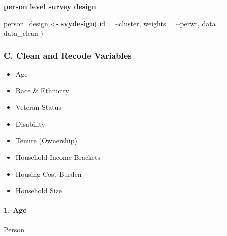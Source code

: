 \documentclass[
]{article}
\newenvironment{Shaded}{\begin{snugshade}}{\end{snugshade}}
\newcommand{\AttributeTok}[1]{\textcolor[rgb]{0.13,0.29,0.53}{#1}}
\newcommand{\CommentTok}[1]{\textcolor[rgb]{0.56,0.35,0.01}{\textit{#1}}}
\newcommand{\ConstantTok}[1]{\textcolor[rgb]{0.56,0.35,0.01}{#1}}
\newcommand{\DecValTok}[1]{\textcolor[rgb]{0.00,0.00,0.81}{#1}}
\newcommand{\FunctionTok}[1]{\textcolor[rgb]{0.13,0.29,0.53}{\textbf{#1}}}
\newcommand{\NormalTok}[1]{#1}
\newcommand{\OtherTok}[1]{\textcolor[rgb]{0.56,0.35,0.01}{#1}}
\newcommand{\SpecialCharTok}[1]{\textcolor[rgb]{0.81,0.36,0.00}{\textbf{#1}}}
\newcommand{\StringTok}[1]{\textcolor[rgb]{0.31,0.60,0.02}{#1}}
\providecommand{\tightlist}{%
  \setlength{\itemsep}{0pt}\setlength{\parskip}{0pt}}
\begin{document}
\textbf{person level survey design}

\begin{Shaded}
\begin{Highlighting}[]
\NormalTok{person\_design }\OtherTok{\textless{}{-}} \FunctionTok{svydesign}\NormalTok{(}
  \AttributeTok{id =} \SpecialCharTok{\textasciitilde{}}\NormalTok{cluster,}
  \AttributeTok{weights =} \SpecialCharTok{\textasciitilde{}}\NormalTok{perwt,}
  \AttributeTok{data =}\NormalTok{ data\_clean}
\NormalTok{)}
\end{Highlighting}
\end{Shaded}

\subsubsection{C. Clean and Recode
Variables}\label{c.-clean-and-recode-variables}

\begin{itemize}
\tightlist
\item
  Age
\item
  Race \& Ethnicity
\item
  Veteran Status
\item
  Disability
\item
  Tenure (Ownership)
\item
  Household Income Brackets
\item
  Housing Cost Burden
\item
  Household Size
\end{itemize}

\paragraph{1. Age}\label{age}

Person

\begin{Shaded}
\end{Shaded}
\end{document}
